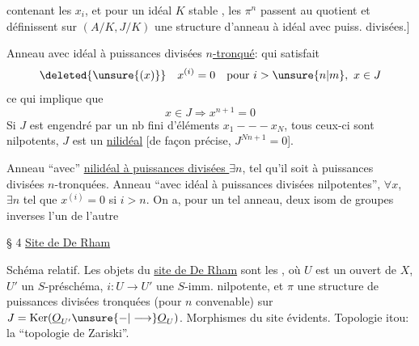 contenant les $x_i$, et pour un idéal $K$ stable , les $\pi^n$ passent au quotient et définissent sur $(A/K,J/K)$ une structure d'anneau à idéal avec puiss. divisées.]

Anneau avec idéal à puissances divisées \uline{$n$-tronqué}: qui satisfait
\[
\deleted{\unsure{(x)}}\quad x^{(i)}=0\quad\text{pour }i>\unsure{n|m},\ x\in J
\]
ce qui implique que
\[
x\in J\Longrightarrow x^{n+1}=0
\]
Si $J$ est engendré par un nb fini d'éléments $x_1---x_N$, tous ceux-ci sont nilpotents, $J$ est un \uline{nilidéal} [de façon précise, $J^{Nn+1}=0$]. 

Anneau ``avec'' \uline{nilidéal à puissances divisées }  $\exists n$, tel  qu'il soit  à puissances divisées $n$-tronquées. Anneau ``avec idéal à puissances divisées nilpotentes'', $\forall x$, $\exists n$ tel que $x^{(i)}=0$ si $i>n$. On a, pour un tel anneau, deux isom de groupes inverses l'un de l'autre



§ 4 \uline{Site de De Rham}


Schéma relatif. Les objets du \uline{site de De Rham}  sont les   , où $U$ est un ouvert de $X$,  $U'$ un $S$-préschéma, $i:U\longrightarrow U'$ une $S$-imm. nilpotente, et $\pi$ une structure de puissances divisées tronquées (pour $n$ convenable) sur $J=\operatorname{Ker}(\underline{O}_{U'}\unsure{-|\longrightarrow}\underline{O}_U)$. Morphismes du site évidents. Topologie itou: la ``topologie de Zariski''.

